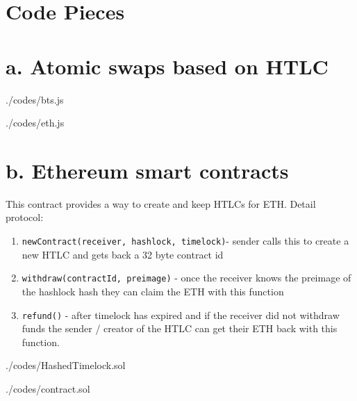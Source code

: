 \section{Code Pieces}




\section{a. Atomic swaps based on HTLC}

\begin{lstinputlisting}[language=JavaScript, captionpos=t, caption=Bitshares side, firstline = 10, lastline = 50]{./codes/bts.js}
\end{lstinputlisting}
\begin{lstinputlisting}[language=JavaScript, captionpos=t, caption=Ethereum Side, firstline = 14, lastline =50]{./codes/eth.js}


	
\end{lstinputlisting}

\section{b. Ethereum smart contracts}

\noindent This contract provides a way to create and keep
HTLCs for ETH. Detail protocol:

\begin{enumerate}
	\item \texttt{newContract(receiver, hashlock, timelock)}- sender calls this to create a new HTLC and gets back a 32 byte contract id
	\item \texttt{withdraw(contractId, preimage)} - once the receiver knows the preimage of the hashlock hash they can claim the ETH with this function
	\item \texttt{refund()} - after timelock has expired and if the receiver did not withdraw funds the sender / creator of the HTLC can get their ETH back with this function.
       

\end{enumerate}
  

\begin{lstinputlisting}[language=Solidity, firstline = 12, lastline =40, captionpos=t, caption = Hashed Timelock Contracts (HTLCs) on Ethereum]{./codes/HashedTimelock.sol}

\end{lstinputlisting}


\begin{lstinputlisting}[language=Solidity, firstline=20, lastline=50, captionpos =t, caption= Ethereum micro-payment channel -- Machinomy]{./codes/contract.sol}
	
\end{lstinputlisting}



